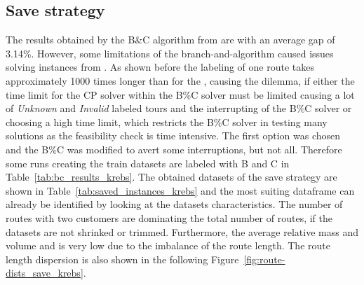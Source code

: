 \subsection{Save strategy}
\label{subsec:challenges_krebs_save}

The results obtained by the B\&C algorithm from \cite{tamke_branch-and-cut_2024} are with an average gap of 3.14\%. However, some limitations
of the branch-and-algorithm caused issues solving instances from \krebsADataSetText. As shown before the labeling of one route takes approximately
1000 times longer than for the \gendreauDataSetText, causing the dilemma, if either the time limit for the \gls{CP} solver within the B\%C solver
must be limited causing a lot of \textit{Unknown} and \textit{Invalid} labeled tours and the interrupting of the B\%C solver or choosing
a high time limit, which restricts the B\%C solver in testing many solutions as the feasibility check is time intensive. The first option
was chosen and the B\%C was modified to avert some interruptions, but not all. Therefore some runs creating the train datasets are labeled with
B and C in Table~\ref{tab:bc_results_krebs}. The obtained datasets of the save strategy are shown in Table~\ref{tab:saved_instances_krebs}
and the most suiting dataframe can already be identified by looking at the datasets characteristics. The number of routes with two customers
are dominating the total number of routes, if the datasets are not shrinked or trimmed. Furthermore, the average relative mass and volume and
is very low due to the imbalance of the route length. The route length dispersion is also shown in the following Figure~\ref{fig:route-dists_save_krebs}.

